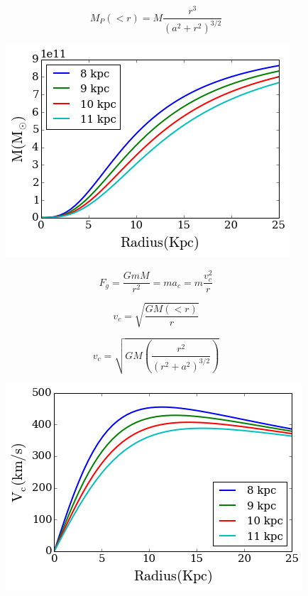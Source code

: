 \documentclass[a4paper, 12pt]{article} %
\begin{document}
\begin{equation}
M_P(<r) = M \frac{r^3}{(a^2+r^2)^{3/2}}
\end{equation}


\begin{figure}[H]
\centering
\includegraphics[scale=0.5]{plummer_mass.png}
\end{figure}


\begin{equation}
F_g = \frac{GmM}{r^2} = ma_c = m \frac{v_c^2}{r}
\end{equation}

\begin{equation}
v_c = \sqrt{\frac{GM(<r)}{r}}
\end{equation}

\begin{equation}
v_c = \sqrt{GM(\frac{r^2}{(r^2+a^2)^{3/2}})}
\end{equation}


\begin{figure}[H]
\centering
\includegraphics[scale=0.5]{plummer_velocity.png}
\end{figure}
\end{document}
